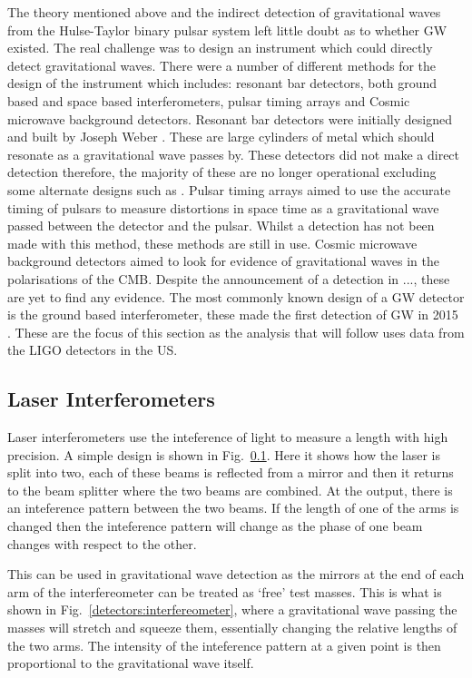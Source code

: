 The theory mentioned above and the indirect detection of gravitational waves from the Hulse-Taylor binary pulsar system left little doubt as to whether \ac{GW} existed. 
The real challenge was to design an instrument which could directly detect gravitational waves.
There were a number of different methods for the design of the instrument which includes: resonant bar detectors, both ground based and space based interferometers, pulsar timing arrays and Cosmic microwave background detectors. 
Resonant bar detectors were initially designed and built by Joseph Weber \cite{}.
These are large cylinders of metal which should resonate as a gravitational wave passes by. 
These detectors did not make a direct detection therefore, the majority of these are no longer operational excluding some alternate designs such as \cite{}.
Pulsar timing arrays aimed to use the accurate timing of pulsars to measure distortions in space time as a gravitational wave passed between the detector and the pulsar. 
Whilst a detection has not been made with this method, these methods are still in use.
Cosmic microwave background detectors aimed to look for evidence of gravitational waves in the polarisations of the CMB. 
Despite the announcement of a detection in ..., these are yet to find any evidence.
The most commonly known design of a \ac{GW} detector is the ground based interferometer, these made the first detection of \ac{GW} in 2015 \cite{}.
These are the focus of this section as the analysis that will follow uses data from the \ac{LIGO} detectors in the US.

\subsection{Laser Interferometers}

Laser interferometers use the inteference of light to measure a length with high precision.
A simple design is shown in Fig.~\ref{}. 
Here it shows how the laser is split into two, each of these beams is reflected from a mirror and then it returns to the beam splitter where the two beams are combined.
At the output, there is an inteference pattern between the two beams.
If the length of one of the arms is changed then the inteference pattern will change as the phase of one beam changes with respect to the other.

This can be used in gravitational wave detection as the mirrors at the end of each arm of the interfereometer can be treated as `free' test masses.
This is what is shown in Fig.~\ref{detectors:interfereometer}, where a gravitational wave passing the masses will stretch and squeeze them, essentially changing the relative lengths of the two arms.
The intensity of the inteference pattern at a given point is then proportional to the gravitational wave itself.

